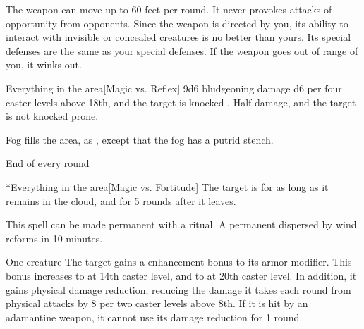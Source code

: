 The weapon can move up to 60 feet per round. It never provokes attacks of opportunity from opponents. Since the weapon is directed by you, its ability to interact with invisible or concealed creatures is no better than yours. Its special defenses are the same as your special defenses. If the weapon goes out of range of you, it winks out.

\spelldur{\durshort \dismissable}
\begin{spelltarget}{Everything in the area}[Magic vs. Reflex]
    \spellsuccess 9d6 bludgeoning damage \add d6 per four caster levels above 18th, and the target is knocked \prone.
    \spellfailure Half damage, and the target is not knocked prone.
\end{spelltarget}

\spelldur{\durshort}
\spellline
\spelleffect Fog fills the area, as , except that the fog has a putrid stench.
\begin{spelltrigger}{End of every round}
    \begin{spelltarget}*{Everything in the area}[Magic vs. Fortitude]
        \spellsuccess The target is \sickened for as long as it remains in the cloud, and for 5 rounds after it leaves.
    \end{spelltarget}
\end{spelltrigger}
\spellnotes This spell can be made permanent with a  ritual. A permanent  dispersed by wind reforms in 10 minutes. \fogspellnotes \fogwindspellnotes

\spelldur{\durshort}
\begin{spelltarget}{One creature}
    \spelleffect The target gains a  enhancement bonus to its armor modifier. This bonus increases to  at 14th caster level, and to  at 20th caster level. In addition, it gains physical damage reduction, reducing the damage it takes each round from physical attacks by 8  per two caster levels above 8th. If it is hit by an adamantine weapon, it cannot use its damage reduction for 1 round.
\end{spelltarget}

